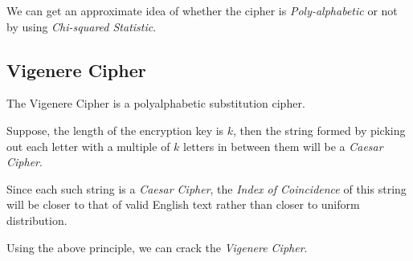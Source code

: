 \documentclass[10pt,twoside]{article}
\begin{document}
We can get an approximate idea of whether the cipher is \textit{Poly-alphabetic} or not by using \textit{Chi-squared Statistic}.

\subsection{Vigenere Cipher} \label{vc}
The Vigenere Cipher is a polyalphabetic substitution cipher. \newline

Suppose, the length of the encryption key is $k$, then the string formed by picking out each letter with a multiple of $k$ letters in between them will be a \textit{Caesar Cipher}. \newline

Since each such string is a \textit{Caesar Cipher}, the \textit{Index of Coincidence} of this string will be closer to that of valid English text rather than closer to uniform distribution. \newline

Using the above principle, we can crack the \textit{Vigenere Cipher}.



\end{document}
